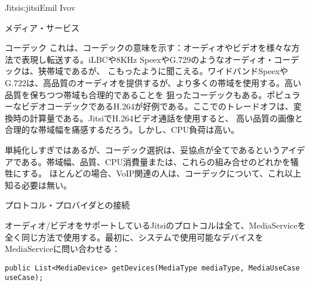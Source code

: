 \begin{aosachapter}{Jitsi}{s:jitsi}{Emil Ivov}
\begin{aosasect1}{メディア・サービス}
\begin{aosasect2}{コーデック}
これは、コーデックの意味を示す：オーディオやビデオを様々な方法で表現し転送する。iLBCや8KHz SpeexやG.729のようなオーディオ・コーデックは、狭帯域であるが、
こもったように聞こえる。ワイドバンドSpeexやG.722は、高品質のオーディオを提供するが、より多くの帯域を使用する。高い品質を保ちつつ帯域も合理的であることを
狙ったコーデックもある。ポピュラーなビデオコーデックであるH.264が好例である。ここでのトレードオフは、変換時の計算量である。JitsiでH.264ビデオ通話を使用すると、
高い品質の画像と合理的な帯域幅を痛感するだろう。しかし、CPU負荷は高い。

単純化しすぎではあるが、コーデック選択は、妥協点が全てであるというアイデアである。帯域幅、品質、CPU消費量または、これらの組み合せのどれかを犠牲にする。
ほとんどの場合、VoIP関連の人は、コーデックについて、これ以上知る必要は無い。

\end{aosasect2}

\begin{aosasect2}{プロトコル・プロバイダとの接続}

オーディオ/ビデオをサポートしているJitsiのプロトコルは全て、MediaServiceを全く同じ方法で使用する。最初に、システムで使用可能なデバイスをMediaServiceに問い合わせる：

\begin{verbatim}
public List<MediaDevice> getDevices(MediaType mediaType, MediaUseCase useCase);
\end{verbatim}


\end{aosasect2}
\end{aosasect1}
\end{aosachapter}
